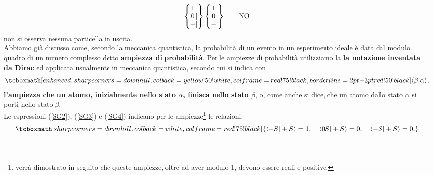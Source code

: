 \documentclass[a4paper,12pt,oneside]{book}
\begin{document}
	\begin{equation}
		\begin{Bmatrix}
 			\makebox[\widthof{$-$}]{$+$}\makebox[\widthof{$|$}]{$\ $} \\ \makebox[\widthof{$-$}]{$0$}|\\ - |  
		\end{Bmatrix}
		\begin{Bmatrix}
 			\makebox[\widthof{$-$}]{$+$} |  \\ \makebox[\widthof{$-$}]{$0$}|  \\ -\makebox[\widthof{$|$}]{$\ $}  
		\end{Bmatrix} \qquad \text{NO}
	\label{SG4}
	\end{equation}
non si osserva nessuna particella in uscita.\\

Abbiamo già discusso come, secondo la meccanica quantistica, la probabilità di un evento in un esperimento ideale è data dal modulo quadro di un numero complesso detto \textbf{ampiezza di probabilità}. Per le ampiezze di probabilità utilizziamo la \textbf{la notazione inventata da Dirac} ed applicata usualmente in meccanica quantistica, secondo cui si indica con 
	\begin{equation}
		\tcboxmath[enhanced,sharp corners=downhill ,colback=yellow!50!white,colframe=red!75!black, borderline={2pt}{-3pt}{red!50!black}]{
			\langle\beta |\alpha \rangle ,
			}
	\end{equation} 
\textbf{l'ampiezza che un atomo, inizialmente nello stato $\alpha$, finisca nello stato $\beta$}, o, come anche si dice, che un atomo dallo stato $\alpha$ si porti nello stato $\beta$.\\

Le espressioni (\ref{SG2}), (\ref{SG3}) e (\ref{SG4}) indicano per le ampiezze\footnote{verrà dimostrato in seguito che queste ampiezze, oltre ad aver modulo 1, devono essere reali e positive.} le relazioni:
	\begin{equation}
		\tcboxmath[sharp corners=downhill ,colback=white,colframe=red!75!black]{
			\langle +S |+S \rangle =1, \quad \langle 0S | +S \rangle =0, \quad \langle -S | +S \rangle=0 .
			}
	\label{cap3_1}
	\end{equation} \\
\end{document}

